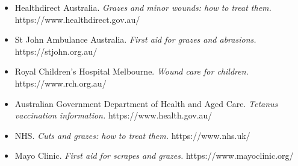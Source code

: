 \begin{itemize}
    \item Healthdirect Australia. \textit{Grazes and minor wounds: how to treat them.} https://www.healthdirect.gov.au/
    \item St John Ambulance Australia. \textit{First aid for grazes and abrasions.} https://stjohn.org.au/
    \item Royal Children's Hospital Melbourne. \textit{Wound care for children.} https://www.rch.org.au/
    \item Australian Government Department of Health and Aged Care. \textit{Tetanus vaccination information.} https://www.health.gov.au/
    \item NHS. \textit{Cuts and grazes: how to treat them.} https://www.nhs.uk/
    \item Mayo Clinic. \textit{First aid for scrapes and grazes.} https://www.mayoclinic.org/
\end{itemize}
